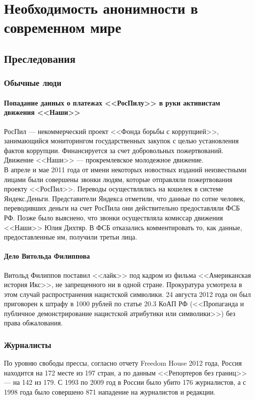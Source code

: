\chapter{Необходимость анонимности в современном мире}
\section{Преследования}
\subsection{Обычные люди}
\subsubsection{Попадание данных о платежах <<РосПилу>> в руки активистам движения <<Наши>>}
РосПил --- некоммерческий проект <<Фонда борьбы с коррупцией>>, занимающийся мониторингом государственных закупок с целью установления фактов коррупции. Финансируется за счет добровольных пожертвований.\\
Движение <<Наши>> --- прокремлевское молодежное движение.\\
В апреле и мае 2011 года от имени некоторых новостных изданий неизвестными лицами были совершены звонки людям, которые отправляли пожертвования проекту <<РосПил>>\cite{rospil_call}. Переводы осуществлялись на кошелек в системе Яндекс.Деньги. Представители Яндекса отметили, что данные по сотне человек, переводивших деньги на счет РосПила они действительно предоставляли ФСБ РФ\cite{rospil_fsb}. Позже было выяснено, что звонки осуществляла комиссар движения <<Наши>> Юлия Дихтяр\cite{rospil_nashi}. В ФСБ отказались комментировать то, как данные, предоставленные им, получили третьи лица\cite{rospil_nashi}.
\subsubsection{Дело Витольда Филиппова}
Витольд Филиппов поставил <<лайк>> под кадром из фильма <<Американская история Икс>>, не запрещенного ни в одной стране. Прокуратура усмотрела в этом случай распространения нацистской символики\cite{vitold_like}. 24 августа 2012 года он был приговорен к штрафу в 1000 рублей по статье 20.3 КоАП РФ (<<Пропаганда и публичное демонстрирование нацистской атрибутики или символики>>) без права обжалования\cite{vitold_judge}.
\subsection{Журналисты}
По уровню свободы прессы, согласно отчету Freedom House 2012 года, Россия находится на 172 месте из 197 стран\cite{pressfreedom}, а по данным <<Репортеров без границ>> --- на 142 из 179\cite{rsf}. С 1993 по 2009 год в России было убито 176 журналистов\cite{kill}, а с 1998 года было совершено 871 нападение на журналистов и редакции\cite{attack}.
